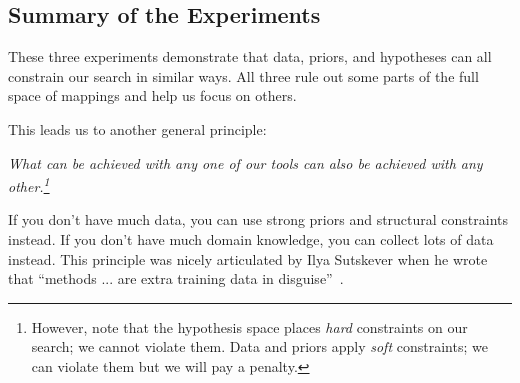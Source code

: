 
\subsection{Summary of the Experiments}

These three experiments demonstrate that data, priors, and hypotheses can all constrain our search in similar ways. All three rule out some parts of the full space of mappings and help us focus on others. 

This leads us to another general principle:
\begin{center}
    \textit{What can be achieved with any one of our tools can also be achieved with any other.\footnote{However, note that the hypothesis space places \textit{hard} constraints on our search; we cannot violate them. Data and priors apply \textit{soft} constraints; we can violate them but we will pay a penalty.}}
\end{center}
If you don't have much data, you can use strong priors and structural constraints instead. If you don't have much domain knowledge, you can collect lots of data instead. This principle was nicely articulated by Ilya Sutskever when he wrote that ``methods ... are extra training data in disguise''~\cite{dataindisguise}. %


